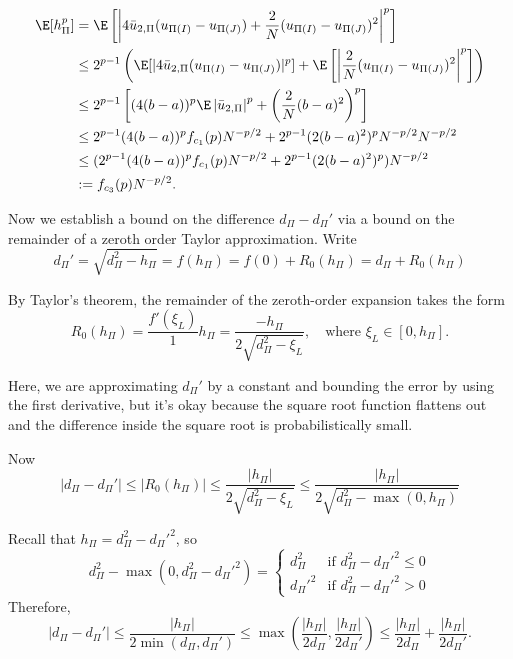 \begin{align}
  \E[h_{\Pi}^p] &= \E \left [ \left | 4\bar{u}_{2,\Pi}(u_{\Pi(I)}-u_{\Pi(J)}) +
      \frac{2}{N}(u_{\Pi(I)}-u_{\Pi(J)})^2 \right |^p \right ] \nonumber \\
  &\leq 2^{p-1} \left ( \E[|4\bar{u}_{2,\Pi}(u_{\Pi(I)}-u_{\Pi(J)})|^p] 
    + \E \left [ \left |\frac{2}{N}(u_{\Pi(I)}-u_{\Pi(J)})^2 \right |^p \right ]
  \right ) \nonumber \\
  &\leq 2^{p-1}\left [ (4(b-a))^p \E \left | \bar{u}_{2,\Pi} \right |^p
    + \left ( \frac{2}{N}(b-a)^2 \right )^p \right ] \nonumber \\
  &\leq 2^{p-1} (4(b-a))^p f_{c_1}(p)N^{-p/2} +
  2^{p-1}(2(b-a)^2)^pN^{-p/2}N^{-p/2} \nonumber \\
  &\leq (2^{p-1} (4(b-a))^p f_{c_1}(p)N^{-p/2} +
  2^{p-1}(2(b-a)^2)^p)N^{-p/2} \nonumber \\
  &:= f_{c_3}(p)N^{-p/2} \label{def:hp}.
\end{align}

Now we establish a bound on the difference $d_{\Pi}-d_{\Pi}'$ via a bound on the remainder of a
zeroth order Taylor approximation.  Write
\begin{equation*}
  d_{\Pi}' = \sqrt{d_{\Pi}^2-h_{\Pi}} = f(h_{\Pi}) = f(0) + R_0(h_{\Pi}) = d_{\Pi} + R_0(h_{\Pi})
\end{equation*}

By Taylor's theorem, the remainder of the zeroth-order expansion takes
the form 
\begin{equation*}
  R_0(h_{\Pi}) = \frac{f'(\xi_L)}{1}h_{\Pi} = \frac{-h_{\Pi}}{2\sqrt{d_{\Pi}^2-\xi_L}}, \quad
  \text{where } \xi_L \in [0, h_{\Pi}].
\end{equation*}

Here, we are approximating $d_{\Pi}'$ by a constant and bounding the error
by using the first derivative, but it's okay because the square root
function flattens out and the difference inside the square root is
probabilistically small.

Now
\begin{equation*}
  |d_{\Pi}-d_{\Pi}'| \leq |R_0(h_{\Pi})| \leq \frac{|h_{\Pi}|}{2\sqrt{d_{\Pi}^2-\xi_L}} \leq
  \frac{|h_{\Pi}|}{2\sqrt{d_{\Pi}^2-\max(0, h_{\Pi})}}
\end{equation*}

Recall that $h_{\Pi} = d_{\Pi}^2 - d_{\Pi}'^2$, so 
\begin{equation*}
  d_{\Pi}^2-\max(0, d_{\Pi}^2-d_{\Pi}'^2) = 
  \begin{cases}
    d_{\Pi}^2 & \text{if } d_{\Pi}^2-d_{\Pi}'^2 \leq 0 \\
    d_{\Pi}'^2 & \text{if } d_{\Pi}^2-d_{\Pi}'^2 > 0
  \end{cases}  
\end{equation*}
Therefore, 
\begin{equation*}
  |d_{\Pi}-d_{\Pi}'| \leq \frac{|h_{\Pi}|}{2\min(d_{\Pi}, d_{\Pi}')} \leq \max \left (
    \frac{|h_{\Pi}|}{2d_{\Pi}}, \frac{|h_{\Pi}|}{2d_{\Pi}'} \right ) \leq 
  \frac{|h_{\Pi}|}{2d_{\Pi}} +  \frac{|h_{\Pi}|}{2d_{\Pi}'}.
\end{equation*}

